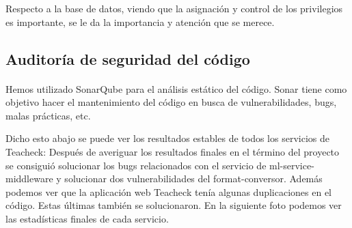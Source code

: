 Respecto a la base de datos, viendo que la asignación y control de los
privilegios es importante, se le da la importancia y atención que se
merece.

\subsection{Auditoría de seguridad del código}
\paragraph{}
Hemos utilizado SonarQube para el análisis estático del código. Sonar tiene como objetivo hacer el mantenimiento del código en busca de vulnerabilidades, bugs,  malas prácticas, etc.

Dicho esto abajo se puede ver los resultados estables de todos los servicios de Teacheck: 
Después de averiguar los resultados finales en el término del proyecto se consiguió solucionar los bugs relacionados con el servicio de ml-service-middleware y solucionar dos vulnerabilidades del format-conversor. Además podemos ver que la aplicación web Teacheck tenía algunas duplicaciones en el código. Estas últimas también se solucionaron. En la siguiente foto podemos ver las estadísticas finales de cada servicio.
